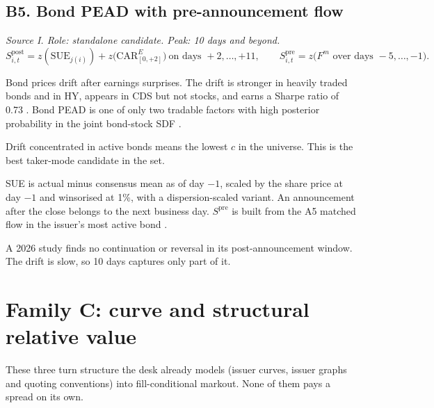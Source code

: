 \documentclass[11pt,letterpaper]{article}
\begin{document}
\subsection{B5. Bond PEAD with pre-announcement flow}
\emph{Source I. Role: standalone candidate. Peak: 10 days and beyond.}
\begin{equation}
S^{\mathrm{post}}_{i,t}=z(\mathrm{SUE}_{j(i)})+z\bigl(\mathrm{CAR}^{E}_{[0,+2]}\bigr)\ \text{on days }+2,\dots,+11,
\qquad
S^{\mathrm{pre}}_{i,t}=z\bigl(F^{m}\text{ over days }-5,\dots,-1\bigr).
\end{equation}
\begin{spec}
\item[Mechanism and evidence.] Bond prices drift after earnings surprises. The drift is stronger in heavily traded bonds and in HY, appears in CDS but not stocks, and earns a Sharpe ratio of 0.73 \cite{nqx}. Bond PEAD is one of only two tradable factors with high posterior probability in the joint bond-stock SDF \cite{zoo2026}.
\item[Why it suits the cost gate.] Drift concentrated in active bonds means the lowest $c$ in the universe. This is the best taker-mode candidate in the set.
\item[Build.] SUE is actual minus consensus mean as of day $-1$, scaled by the share price at day $-1$ and winsorised at 1\%, with a dispersion-scaled variant. An announcement after the close belongs to the next business day. $S^{\mathrm{pre}}$ is built from the A5 matched flow in the issuer's most active bond \cite{wz2016}.
\item[Counter-evidence.] A 2026 study \cite{af2026} finds no continuation or reversal in its post-announcement window. The drift is slow, so 10 days captures only part of it.
\end{spec}
\section{Family C: curve and structural relative value}
\label{sec:famC}

These three turn structure the desk already models (issuer curves, issuer graphs and quoting conventions) into fill-conditional markout. None of them pays a spread on its own.
\end{document}
